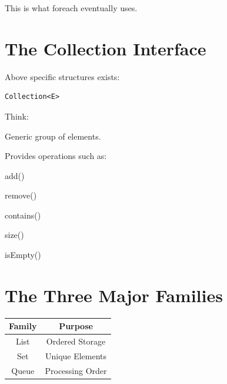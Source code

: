 \documentclass[11pt,a4paper]{book}
\begin{document}
This is what foreach eventually uses.


\section{The Collection Interface}

Above specific structures exists:

\begin{verbatim}
Collection<E>
\end{verbatim}


Think:


Generic group of elements.


Provides operations such as:


add()

remove()

contains()

size()

isEmpty()


\section{The Three Major Families}

\begin{center}

\begin{tabular}{|c|c|}
\hline
Family & Purpose \\
\hline

List &
Ordered Storage \\
\hline

Set &
Unique Elements \\
\hline

Queue &
Processing Order \\
\hline

\end{tabular}

\end{center}
\end{document}

